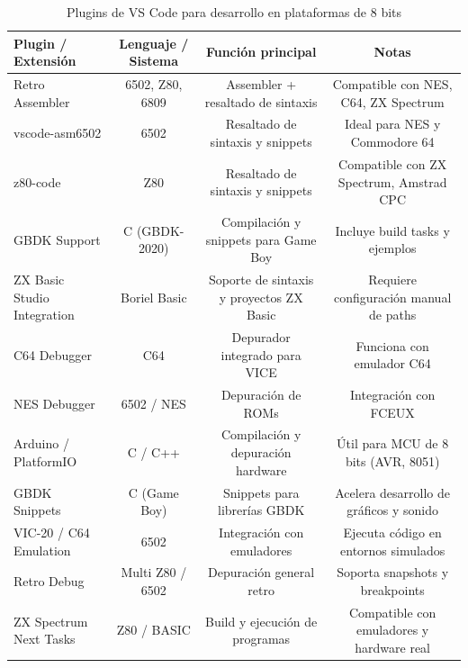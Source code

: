 \documentclass[../../main.tex]{subfiles}
\begin{document}
\begin{table}[!h]
    \caption{Plugins de VS Code para desarrollo en plataformas de 8 bits}
    \centering
    {
        \begin{tabular}{|l|c|c|c|}
            \hline
            \textbf{Plugin / Extensión} & \textbf{Lenguaje / Sistema} & \textbf{Función principal} & \textbf{Notas} \\
            \hline
            Retro Assembler & 6502, Z80, 6809 & Assembler + resaltado de sintaxis & Compatible con NES, C64, ZX Spectrum \\
            \hline
            vscode-asm6502 & 6502 & Resaltado de sintaxis y snippets & Ideal para NES y Commodore 64 \\
            \hline
            z80-code & Z80 & Resaltado de sintaxis y snippets & Compatible con ZX Spectrum, Amstrad CPC \\
            \hline
            GBDK Support & C (GBDK-2020) & Compilación y snippets para Game Boy & Incluye build tasks y ejemplos \\
            \hline
            ZX Basic Studio Integration & Boriel Basic & Soporte de sintaxis y proyectos ZX Basic & Requiere configuración manual de paths \\
            \hline
            C64 Debugger & C64 & Depurador integrado para VICE & Funciona con emulador C64 \\
            \hline
            NES Debugger & 6502 / NES & Depuración de ROMs & Integración con FCEUX \\
            \hline
            Arduino / PlatformIO & C / C++ & Compilación y depuración hardware & Útil para MCU de 8 bits (AVR, 8051) \\
            \hline
            GBDK Snippets & C (Game Boy) & Snippets para librerías GBDK & Acelera desarrollo de gráficos y sonido \\
            \hline
            VIC-20 / C64 Emulation & 6502 & Integración con emuladores & Ejecuta código en entornos simulados \\
            \hline
            Retro Debug & Multi Z80 / 6502 & Depuración general retro & Soporta snapshots y breakpoints \\
            \hline
            ZX Spectrum Next Tasks & Z80 / BASIC & Build y ejecución de programas & Compatible con emuladores y hardware real \\
            \hline
        \end{tabular}
    } 
    \label{tab:vscode-plugins-8bit}
\end{table}
\end{document}

